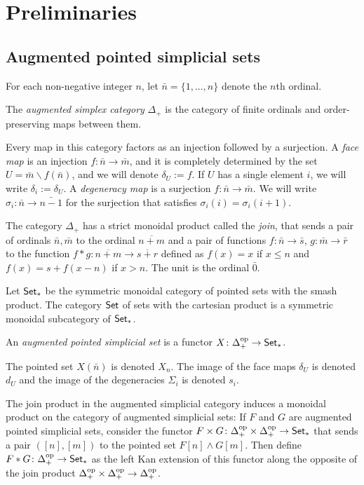 
\section{Preliminaries} \label{s:preliminaries}


\subsection{Augmented pointed simplicial sets} For each non-negative integer $n$, let $\bar{n} = \{1,\ldots,n\}$ denote the $n$th ordinal.
\begin{definition}
    The \emph{augmented simplex category} $\Delta_+$ is the category of finite ordinals and order-preserving maps between them.
\end{definition}
Every map in this category factors as an injection followed by a surjection. A \emph{face map} is an injection $f\colon \bar{n}\to \bar{m}$, and it is completely determined by the set $U = \bar{m}\smallsetminus f(\bar{n})$, and we will denote $\delta_U:= f$. If $U$ has a single element $i$, we will write $\delta_i :=\delta_U$. A \emph{degeneracy map} is a surjection $f\colon \bar{n}\to \bar{m}$. We will write $\sigma_i\colon \bar{n}\to \bar{n-1}$ for the surjection that satisfies $\sigma_i(i) = \sigma_i(i+1)$. 

The category $\Delta_+$ has a strict monoidal product called the \emph{join}, that sends a pair of ordinals $\bar{n},\bar{m}$ to the ordinal $\overline{n+m}$ and a pair of functions $f\colon \bar{n}\to \bar{s}$, $g\colon \bar{m}\to \bar{r}$ to the function $f*g\colon \overline{n+m}\to \overline{s+r}$ defined as $f(x) = x$ if $x\leq n$ and $f(x) = s+f(x-n)$ if $x>n$. The unit is the ordinal $\bar{0}$.

Let $\mathsf{Set}_*$ be the symmetric monoidal category of pointed sets with the smash product. The category $\mathsf{Set}$ of sets with the cartesian product is a symmetric monoidal subcategory of $\mathsf{Set}_*$.  
\begin{definition}
    An \emph{augmented pointed simplicial set} is a functor $X\colon \Delta_+^\mathrm{op}\to \mathsf{Set}_*$.
\end{definition}
The pointed set $X(\bar{n})$ is denoted $X_n$. The image of the face maps $\delta_U$ is denoted $d_U$ and the image of the degeneracies $\Sigma_i$ is denoted $s_i$.

The join product in the augmented simplicial category induces a monoidal product on the category of augmented simplicial sets: If $F$ and $G$ are augmented pointed simplicial sets, consider the functor $F\times G\colon \Delta_+^{\mathrm{op}}\times \Delta_+^{\mathrm{op}}\to \mathsf{Set}_*$ that sends a pair $([n],[m])$ to the pointed set $F[n]\wedge G[m]$. Then define $F*G\colon \Delta_+^{\mathrm{op}}\to \mathsf{Set}_*$ as the left Kan extension of this functor along the opposite of the join product $\Delta_+^{\mathrm{op}}\times \Delta_+^{\mathrm{op}}\to \Delta_+^{\mathrm{op}}$. 

